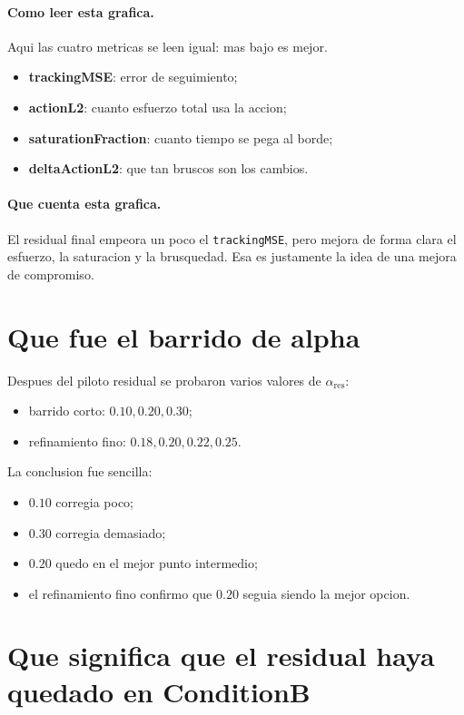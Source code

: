 \documentclass[11pt,a4paper]{article}
\begin{document}
\paragraph{Como leer esta grafica.}
Aqui las cuatro metricas se leen igual: mas bajo es mejor.
\begin{itemize}[leftmargin=1.5em]
\item \textbf{trackingMSE}: error de seguimiento;
\item \textbf{actionL2}: cuanto esfuerzo total usa la accion;
\item \textbf{saturationFraction}: cuanto tiempo se pega al borde;
\item \textbf{deltaActionL2}: que tan bruscos son los cambios.
\end{itemize}

\paragraph{Que cuenta esta grafica.}
El residual final empeora un poco el \texttt{trackingMSE}, pero mejora de forma clara el esfuerzo, la saturacion y la brusquedad. Esa es justamente la idea de una mejora de compromiso.

\section{Que fue el barrido de alpha}

Despues del piloto residual se probaron varios valores de \(\alpha_{\mathrm{res}}\):
\begin{itemize}[leftmargin=1.5em]
\item barrido corto: \(0.10, 0.20, 0.30\);
\item refinamiento fino: \(0.18, 0.20, 0.22, 0.25\).
\end{itemize}

La conclusion fue sencilla:
\begin{itemize}[leftmargin=1.5em]
\item \(0.10\) corregia poco;
\item \(0.30\) corregia demasiado;
\item \(0.20\) quedo en el mejor punto intermedio;
\item el refinamiento fino confirmo que \(0.20\) seguia siendo la mejor opcion.
\end{itemize}

\section{Que significa que el residual haya quedado en ConditionB}
\end{document}
